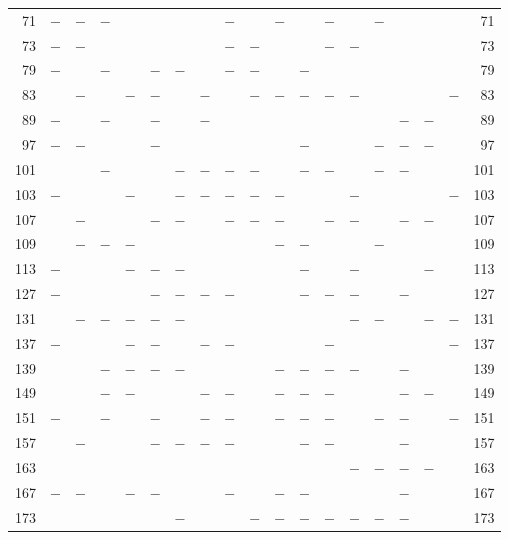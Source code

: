 \begin{center}
\begin{tabular}{r|c|c|c|c|c|c|c|c|c|c|c|c|c|c|c|c|c|r}
71 & $-$ & $-$ & $-$ &  &  &  &  & $-$ &  & $-$ &  & $-$ &  & $-$ &  &  &  & 71\\
73 & $-$ & $-$ &  &  &  &  &  & $-$ & $-$ &  &  & $-$ & $-$ &  &  &  &  & 73\\
79 & $-$ &  & $-$ &  & $-$ & $-$ &  & $-$ & $-$ &  & $-$ &  &  &  &  &  &  & 79\\
83 &  & $-$ &  & $-$ & $-$ &  & $-$ &  & $-$ & $-$ & $-$ & $-$ & $-$ &  &  &  & $-$ & 83\\
89 & $-$ &  & $-$ &  & $-$ &  & $-$ &  &  &  &  &  &  &  & $-$ & $-$ &  & 89\\
97 & $-$ & $-$ &  &  & $-$ &  &  &  &  &  & $-$ &  &  & $-$ & $-$ & $-$ &  & 97\\
101 &  &  & $-$ &  &  & $-$ & $-$ & $-$ & $-$ &  & $-$ & $-$ &  & $-$ & $-$ &  &  & 101\\
103 & $-$ &  &  & $-$ &  & $-$ & $-$ & $-$ & $-$ & $-$ &  &  & $-$ &  &  &  & $-$ & 103\\
107 &  & $-$ &  &  & $-$ & $-$ &  & $-$ & $-$ & $-$ &  & $-$ & $-$ &  & $-$ & $-$ &  & 107\\
109 &  & $-$ & $-$ & $-$ &  &  &  &  &  & $-$ & $-$ &  &  & $-$ &  &  &  & 109\\
113 & $-$ &  &  & $-$ & $-$ & $-$ &  &  &  &  & $-$ &  & $-$ &  &  & $-$ &  & 113\\
127 & $-$ &  &  &  & $-$ & $-$ & $-$ & $-$ &  &  & $-$ & $-$ & $-$ &  & $-$ &  &  & 127\\
131 &  & $-$ & $-$ & $-$ & $-$ & $-$ &  &  &  &  &  &  & $-$ & $-$ &  & $-$ & $-$ & 131\\
137 & $-$ &  &  & $-$ & $-$ &  & $-$ & $-$ &  &  &  & $-$ &  &  &  &  & $-$ & 137\\
139 &  &  & $-$ & $-$ & $-$ & $-$ &  &  &  & $-$ & $-$ & $-$ & $-$ &  & $-$ &  &  & 139\\
149 &  &  & $-$ & $-$ &  &  & $-$ & $-$ &  & $-$ & $-$ & $-$ &  &  & $-$ & $-$ &  & 149\\
151 & $-$ &  & $-$ &  & $-$ &  & $-$ & $-$ &  & $-$ & $-$ & $-$ &  & $-$ & $-$ &  & $-$ & 151\\
157 &  & $-$ &  &  & $-$ & $-$ & $-$ & $-$ &  &  & $-$ & $-$ &  &  & $-$ &  &  & 157\\
163 &  &  &  &  &  &  &  &  &  &  &  &  & $-$ & $-$ & $-$ & $-$ &  & 163\\
167 & $-$ & $-$ &  & $-$ & $-$ &  &  & $-$ &  & $-$ & $-$ &  &  &  & $-$ &  &  & 167\\
173 &  &  &  &  &  & $-$ &  &  & $-$ & $-$ & $-$ & $-$ & $-$ & $-$ & $-$ &  &  & 173\\

\end{tabular}
\end{center}
